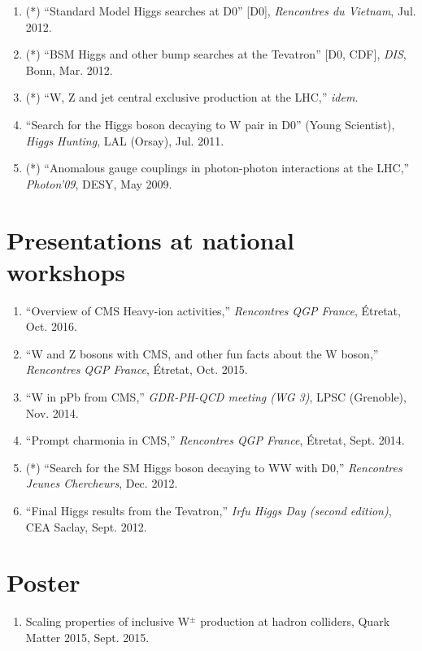 \documentclass[a4paper,11pt]{article}
\begin{document}
\begin{enumerate}
\item (*) ``Standard Model Higgs searches at D0'' [D0], \emph{Rencontres du 
Vietnam}, Jul. 2012.
\item (*) ``BSM Higgs and other bump searches at the Tevatron'' [D0, CDF], 
\emph{DIS}, Bonn, Mar. 2012.
\item (*) ``W, Z and jet central exclusive production at the LHC,'' 
\emph{idem}.%
\item ``Search for the Higgs boson decaying to W pair in D0'' (Young Scientist), 
\emph{Higgs Hunting}, LAL (Orsay), Jul. 2011.
\item (*) ``Anomalous gauge couplings in photon-photon interactions at the LHC,'' \emph{Photon'09}, DESY, May 2009.
 \end{enumerate}

 
 \section*{Presentations at national workshops}
 
 
 \begin{enumerate}
 \item ``Overview of CMS Heavy-ion activities,'' \emph{Rencontres QGP France}, Étretat, Oct. 2016.
 \item ``W and Z bosons with CMS, and other fun facts about the W boson,'' \emph{Rencontres QGP France}, Étretat, Oct. 2015.
 \item ``W in pPb from CMS,'' \emph{GDR-PH-QCD meeting (WG 3)}, LPSC (Grenoble), Nov. 2014.
 \item ``Prompt charmonia in CMS,'' \emph{Rencontres QGP France}, Étretat, Sept. 2014.
 \item (*) ``Search for the SM Higgs boson decaying to WW with D0,'' \emph{Rencontres Jeunes 
Chercheurs}, Dec. 2012.
 \item ``Final Higgs results from the Tevatron,'' \emph{Irfu Higgs Day (second edition)}, CEA Saclay, Sept. 2012.
\end{enumerate}

\section*{Poster}
\begin{enumerate}
 \item Scaling properties of inclusive W$^\pm$ production at hadron colliders, Quark Matter 2015, Sept. 2015.
\end{enumerate}
\end{document}
